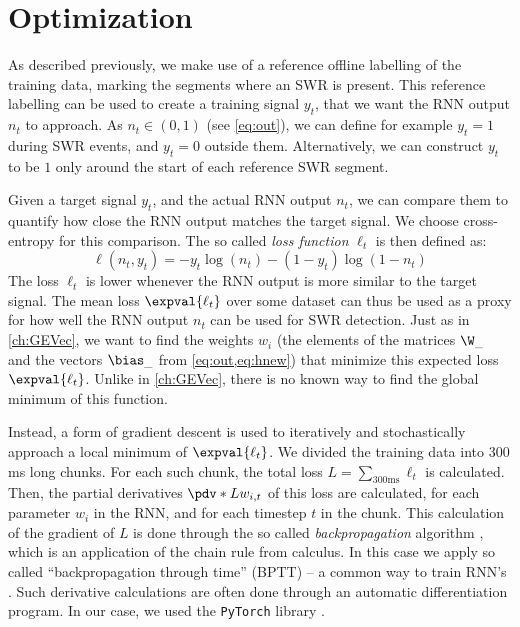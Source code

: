 \section{Optimization}
\label{sec:RNN-optim}

As described previously, we make use of a reference offline labelling of the training data, marking the segments where an SWR is present. This reference labelling can be used to create a training signal $y_t$, that we want the RNN output $n_t$ to approach. As $n_t \in (0, 1)$ (see \cref{eq:out}), we can define for example $y_t = 1$ during SWR events, and $y_t = 0$ outside them. Alternatively, we can construct $y_t$ to be $1$ only around the start of each reference SWR segment.

Given a target signal $y_t$, and the actual RNN output $n_t$, we can compare them to quantify how close the RNN output matches the target signal. We choose cross-entropy for this comparison. The so called \emph{loss function} $\ell_t$ is then defined as:
%
\begin{equation}
\label{eq:loss}
\ell(n_t, y_t) = - y_t \log(n_t) - (1 - y_t) \log(1 - n_t)
\end{equation}
%
The loss $\ell_t$ is lower whenever the RNN output is more similar to the target signal. The mean loss $\expval{\ell_t}$ over some dataset can thus be used as a proxy for how well the RNN output $n_t$ can be used for SWR detection. Just as in \cref{ch:GEVec}, we want to find the weights $w_i$ (the elements of the matrices $\W_\_$ and the vectors $\bias_\_$ from \cref{eq:out,eq:hnew}) that minimize this expected loss $\expval{\ell_t}$. Unlike in \cref{ch:GEVec}, there is no known way to find the global minimum of this function.

Instead, a form of gradient descent is used to iteratively and stochastically approach a local minimum of $\expval{\ell_t}$. We divided the training data into 300 ms long chunks. For each such chunk, the total loss $L = \sum_{300 \text{ms}} \ell_t$ is calculated. Then, the partial derivatives $\pdv*{L}{w_{i,t}}$ of this loss are calculated, for each parameter $w_i$ in the RNN, and for each timestep $t$ in the chunk. This calculation of the gradient of $L$ is done through the so called \emph{backpropagation} algorithm \cite{Rumelhart1986}, which is an application of the chain rule from calculus. In this case we apply so called ``backpropagation through time'' (BPTT) -- a common way to train RNN's \cite{Goodfellow2016}. Such derivative calculations are often done through an automatic differentiation program. In our case, we used the \texttt{PyTorch} library \cite{Paszke2017}.

